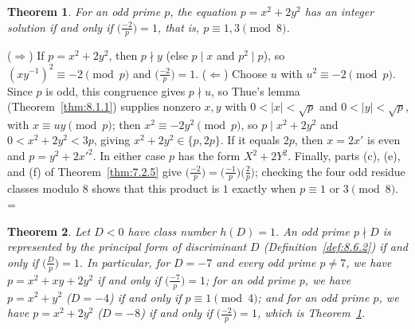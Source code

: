 \documentclass[11pt]{article}
\makeatletter
\let\nt@closedisplay\]
\def\nt@guardedclose{\@ifnextchar\par{\nt@closeafterpar}{\@ifnextchar\end{\postdisplaypenalty\@M\nt@closedisplay}{\nt@closedisplay}}}
\def\nt@closeafterpar\par{\@ifnextchar\par{\nt@closeafterpar}{\@ifnextchar\end{\postdisplaypenalty\@M\nt@closedisplay\par}{\nt@closedisplay\par}}}
\renewenvironment{proof}[1][\proofname]{\par
  \pushQED{\qed}\normalfont\topsep\medskipamount\edef\nt@afterproof{\@endparpenalty=\the\@endparpenalty\relax}\@beginparpenalty\@M\@endparpenalty\@M\let\]\nt@guardedclose\trivlist\item[]\textit{#1\@addpunct{.}} \ignorespaces}{\ifvmode\addpenalty\@M\fi\popQED\nt@afterproof\endtrivlist\@endpefalse}
\theoremstyle{ntstyle}
\newtheorem{theorem}{Theorem}[subsection]
\newcommand{\legs}[2]{\bigl(\tfrac{#1}{#2}\bigr)}
\makeatother
\begin{document}
\begin{theorem}\label{thm:8.6.4} For an
  odd prime $p$, the equation $p = x^2 + 2y^2$ has an integer solution
  if and only if $\legs{-2}{p} = 1$, that is, $p \equiv 1, 3 \pmod{8}$.

\end{theorem}

\begin{proof} ($\Rightarrow$) If $p = x^2 + 2y^2$, then $p \nmid y$ (else $p \mid x$ and $p^2 \mid p$), so $(xy^{-1})^2 \equiv -2 \pmod{p}$ and $\legs{-2}{p} = 1$. ($\Leftarrow$)
  Choose $u$ with $u^2 \equiv -2 \pmod{p}$. Since $p$ is odd, this
  congruence gives $p\nmid u$, so Thue's lemma
  (Theorem~\ref{thm:8.1.1}) supplies nonzero $x,y$ with
  $0<|x|<\sqrt{p}$ and $0<|y|<\sqrt{p}$, with
  $x \equiv u y \pmod{p}$; then $x^2 \equiv -2y^2 \pmod{p}$, so $p \mid x^2 + 2y^2$ and $0 < x^2 + 2y^2 < 3p$,
  giving $x^2 + 2y^2 \in \{p, 2p\}$. If it equals $2p$, then $x = 2x'$ is even and $p = y^2 + 2x'^2$. In either
  case $p$ has the form $X^2 + 2Y^2$. Finally,
  parts (c), (e), and (f) of Theorem~\ref{thm:7.2.5} give
  $\legs{-2}{p}=\legs{-1}{p}\legs{2}{p}$; checking the four odd residue
  classes modulo $8$ shows that this product is $1$ exactly when
  $p\equiv1$ or $3\pmod{8}$.
\end{proof}

\begin{theorem}\label{thm:8.6.5} Let $D < 0$ have class
  number $h(D) = 1$. An odd
  prime $p \nmid D$ is represented by the principal form of
  discriminant $D$ (Definition~\ref{def:8.6.2}) if and only if $\legs{D}{p} = 1$. In
  particular, for $D=-7$ and every odd prime $p\neq7$, we have
  $p=x^2+xy+2y^2$ if and only if $\legs{-7}{p}=1$;
  for an odd prime $p$, we have $p = x^2 + y^2$ ($D = -4$) if and only if $p \equiv 1 \pmod{4}$; and for an odd
  prime $p$, we have $p = x^2 + 2y^2$ ($D = -8$) if and
  only if $\legs{-2}{p} = 1$, which is Theorem~\ref{thm:8.6.4}.

\end{theorem}
\end{document}

